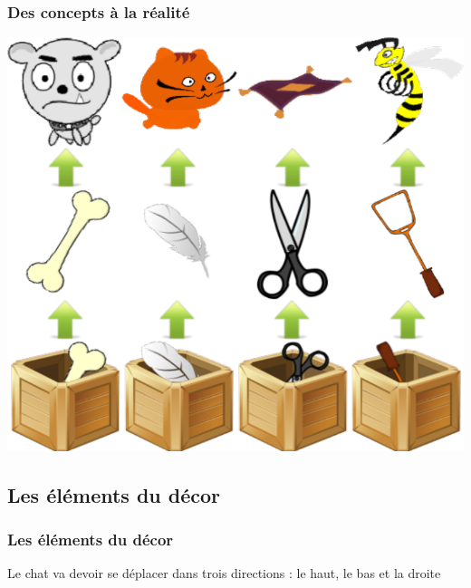 \documentclass{beamer}
\begin{document}
\begin{frame}
\frametitle{Des concepts à la réalité}

\begin{center}
\includegraphics[scale=0.24]{images/esthetique.png}
\end{center}
\end{frame}

\subsection{Les éléments du décor}
\begin{frame}
\frametitle{Les éléments du décor}
Le chat va devoir se déplacer dans trois directions : le haut, le bas et la droite
\end{frame}
\end{document}
